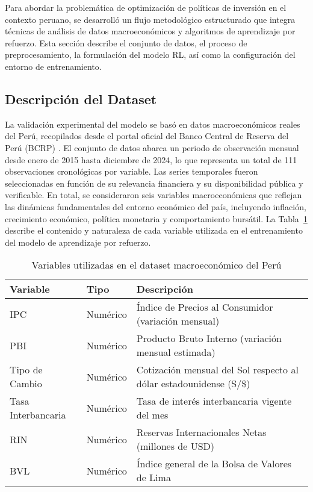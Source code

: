 \documentclass[conference]{IEEEtran}
\begin{document}
	Para abordar la problemática de optimización de políticas de inversión en el contexto peruano, se desarrolló un flujo metodológico estructurado que integra técnicas de análisis de datos macroeconómicos y algoritmos de aprendizaje por refuerzo. Esta sección describe el conjunto de datos, el proceso de preprocesamiento, la formulación del modelo RL, así como la configuración del entorno de entrenamiento.
	
	\subsection{Descripción del Dataset}
	
	La validación experimental del modelo se basó en datos macroeconómicos reales del Perú, recopilados desde el portal oficial del Banco Central de Reserva del Perú (BCRP) \cite{bcrp2024}. El conjunto de datos abarca un periodo de observación mensual desde enero de 2015 hasta diciembre de 2024, lo que representa un total de 111 observaciones cronológicas por variable. Las series temporales fueron seleccionadas en función de su relevancia financiera y su disponibilidad pública y verificable. En total, se consideraron seis variables macroeconómicas que reflejan las dinámicas fundamentales del entorno económico del país, incluyendo inflación, crecimiento económico, política monetaria y comportamiento bursátil. La Tabla~\ref{tab:variables_dataset} describe el contenido y naturaleza de cada variable utilizada en el entrenamiento del modelo de aprendizaje por refuerzo.
	
	\begin{table}[ht]
		\caption{Variables utilizadas en el dataset macroeconómico del Perú}
		\label{tab:variables_dataset}
		\centering
		\begin{tabular}{llp{4.2cm}}
			\toprule
			\textbf{Variable} & \textbf{Tipo} & \textbf{Descripción} \\
			\midrule
			IPC & Numérico & Índice de Precios al Consumidor (variación mensual) \\
			PBI & Numérico & Producto Bruto Interno (variación mensual estimada) \\
			Tipo de Cambio & Numérico & Cotización mensual del Sol respecto al dólar estadounidense (S/\$) \\
			Tasa Interbancaria & Numérico & Tasa de interés interbancaria vigente del mes \\
			RIN & Numérico & Reservas Internacionales Netas (millones de USD) \\
			BVL & Numérico & Índice general de la Bolsa de Valores de Lima \\
			\bottomrule
		\end{tabular}
	\end{table}
	
\end{document}
